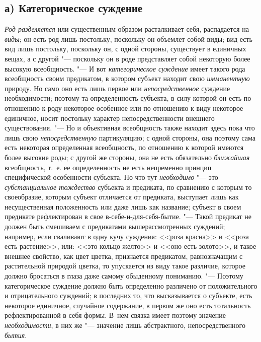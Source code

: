 \subsection[а) Категорическое суждение]{а) Категорическое суждение}
{\em Род разделяется} или
существенным образом расталкивает себя, распадается на
{\em виды}; он есть род
лишь постольку, поскольку он объемлет собой виды; вид есть вид лишь
постольку, поскольку он, с одной стороны, существует в единичных вещах, а с
другой "--- поскольку он в роде представляет собой некоторую
более высокую всеобщность. "--- И вот
{\em категорическое суждение}
имеет такого рода всеобщность своим предикатом, в котором
субъект находит свою {\em имманентную}
природу. Но само оно есть лишь первое или
{\em непосредственное}
суждение необходимости; поэтому та определенность субъекта, в
силу которой он есть по отношению к роду некоторое особенное или по
отношению к виду некоторое единичное, носит постольку характер
непосредственности внешнего существования. "--- Но и
объективная всеобщность также находит здесь пока что лишь
свою {\em непосредственную}
партикуляцию; с одной стороны, она поэтому сама есть
некоторая определенная всеобщность, по отношению к которой имеются более
высокие роды; с другой же стороны, она не есть обязательно
{\em ближайшая}
всеобщность, т.~е. ее определенность не есть непременно
принцип специфической особенности субъекта. Но что тут
{\em необходимо} "--- это
{\em субстанциальное тождество}
субъекта и предиката, по сравнению с которым то своеобразие,
которым субъект отличается от предиката, выступает лишь как несущественная
положенность или даже лишь как название; субъект в своем предикате
рефлектирован в свое в-себе-и-для-себя-бытие. "--- Такой
предикат не должен быть смешиваем с предикатами вышерассмотренных суждений;
например, если сваливают в одну кучу суждения:
<<роза красна>> и
<<роза есть растение>>,
или:
<<это кольцо желто>> и
<<оно есть золото>>,
и такое внешнее свойство, как цвет цветка, признается
предикатом, равнозначащим с растительной природой цветка, то упускается из
виду такое различие, которое должно бросаться в глаза даже самому
обыденному пониманию. "--- Поэтому категорическое суждение
должно быть определенно различено от положительного и отрицательного
суждений; в последних то, что высказывается о субъекте, есть некоторое
единичное, случайное содержание, в первом же оно есть тотальность
рефлектированной в себя формы. В~нем связка имеет поэтому значение
{\em необходимости}, в
них же "--- значение лишь абстрактного, непосредственного
{\em бытия}.

